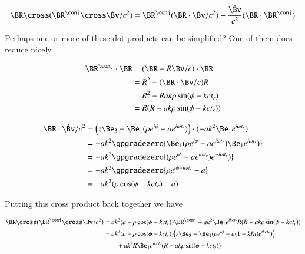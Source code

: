 {\begin{equation}\label{eqn:relativisticElectrodynamicsExamReflection:620}
\BR \cross (\BR^\conj \cross \dot{\Bv}/c^2)
=
\BR^\conj (\BR \cdot \dot{\Bv}/c^2)
- \frac{\dot{\Bv}}{c^2}
(\BR \cdot \BR^\conj)
\end{equation}

Perhaps one or more of these dot products can be simplified?  One of them does reduce nicely

\begin{equation}\label{eqn:relativisticElectrodynamicsExamReflection:1110}
\begin{aligned}
\BR^\conj \cdot \BR
&= ( \BR - R \Bv/c ) \cdot \BR  \\
&= R^2 - (\BR \cdot \Bv/c) R \\
&= R^2 - R a k \rho \sin(\phi - k c t_r) \\
&= R(R - a k \rho \sin(\phi - k c t_r))
\end{aligned}
\end{equation}

\begin{equation}\label{eqn:relativisticElectrodynamicsExamReflection:1130}
\begin{aligned}
\BR \cdot \dot{\Bv}/c^2
&=
\Bigl(z \Be_3 + \Be_1 (\rho e^{i \phi} - a e^{i \omega t_r} ) \Bigr) \cdot
(-a k^2 \Be_1 e^{i \omega t_r} )  \\
&=
- a k^2 \gpgradezero{
\Be_1 (\rho e^{i \phi} - a e^{i \omega t_r} )
\Be_1 e^{i \omega t_r} )
} \\
&=
- a k^2 \gpgradezero{
(\rho e^{i \phi} - a e^{i \omega t_r} )
e^{-i \omega t_r} )
} \\
&=
- a k^2 \gpgradezero{
\rho e^{i \phi - i \omega t_r} - a
} \\
&=
- a k^2 ( \rho \cos(\phi - k c t_r) - a )
\end{aligned}
\end{equation}

Putting this cross product back together we have

\begin{equation}\label{eqn:relativisticElectrodynamicsExamReflection:1150}
\begin{aligned}
\BR \cross (\BR^\conj \cross \dot{\Bv}/c^2)
&=
a k^2 ( a -\rho \cos(\phi - k c t_r) ) \BR^\conj
+a k^2 \Be_1 e^{i k c  t_r} R(R - a k \rho \sin(\phi - k c t_r)) \\
&=
a k^2 ( a -\rho \cos(\phi - k c t_r) ) \Bigl(
z \Be_3 + \Be_1 (\rho e^{i \phi} - a (1 - k R i) e^{i k c t_r} )
\Bigr) \\
&\qquad +a k^2 R \Be_1 e^{i k c  t_r} (R - a k \rho \sin(\phi - k c t_r))
\end{aligned}
\end{equation}

}
